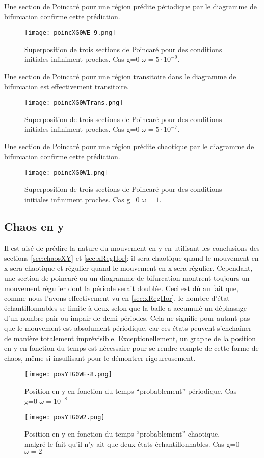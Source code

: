 \documentclass[a4paper]{report}
\begin{document}
Une section de Poincaré pour une région prédite périodique par le diagramme de bifurcation confirme cette prédiction.
\begin{figure}[H]
   \texttt{[image: poincXG0WE-9.png]}
      \caption[Section de Poincaré périodique: g=0 \(\omega=5 \cdot 10^{-9}\)]{Superposition de trois sections de Poincaré pour des conditions initiales infiniment proches. Cas g=0 \(\omega=5 \cdot 10^{-9}\).}
\end{figure}
Une section de Poincaré pour une région transitoire dans le diagramme de bifurcation est effectivement transitoire.
\begin{figure}[H]
   \texttt{[image: poincXG0WTrans.png]}
      \caption[Section de Poincaré transitoire: g=0 \(\omega=5 \cdot 10^{-7}\)]{Superposition de trois sections de Poincaré pour des conditions initiales infiniment proches. Cas g=0 \(\omega=5 \cdot 10^{-7}\).}
\end{figure}
Une section de Poincaré pour une région prédite chaotique par le diagramme de bifurcation confirme cette prédiction.
\begin{figure}[H]
   \texttt{[image: poincXG0W1.png]}
      \caption[Section de Poincaré chaotique: g=0 \(\omega=1\)]{Superposition de trois sections de Poincaré pour des conditions initiales infiniment proches. Cas g=0 \(\omega=1\).}
\end{figure}

\subsection{Chaos en y}

Il est aisé de prédire la nature du mouvement en y en utilisant les conclusions des sections \ref{sec:chaosXY} et \ref{sec:xRegHor}: il sera chaotique quand le mouvement en x sera chaotique et régulier quand le mouvement en x sera régulier. Cependant, une section de poincaré ou un diagramme de bifurcation montrent toujours un mouvement régulier dont la période serait doublée. Ceci est dû au fait que, comme nous l'avons effectivement vu en \ref{sec:xRegHor}, le nombre d'état échantillonnables se limite à deux selon que la balle a accumulé un déphasage d'un nombre pair ou impair de demi-périodes. Cela ne signifie pour autant pas que le mouvement est absolument périodique, car ces états peuvent s'enchaîner de manière totalement imprévisible. Exceptionellement, un graphe de la position en y en fonction du temps est nécessaire pour se rendre compte de cette forme de chaos, même si insuffisant pour le démontrer rigoureusement.
\begin{figure}[H]
   \texttt{[image: posYTG0WE-8.png]}
      \caption{Position en y en fonction du temps ``probablement'' périodique. Cas g=0 \(\omega=10^{-8}\)}
\end{figure}
\begin{figure}[H]
   \texttt{[image: posYTG0W2.png]}
      \caption[Position en y en fonction du temps ``probablement'' chaotique. Cas g=0 \(\omega=2\)]{Position en y en fonction du temps ``probablement'' chaotique, malgré le fait qu'il n'y ait que deux états échantillonnables. Cas g=0 \(\omega=2\)}
\end{figure}
\end{document}
